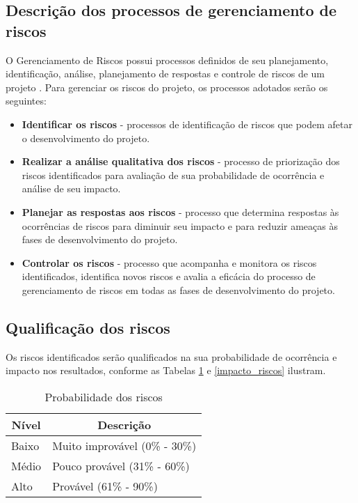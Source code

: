 \subsection{Descrição dos processos de gerenciamento de riscos}

O Gerenciamento de Riscos possui processos definidos de seu planejamento, identificação, análise, planejamento de respostas e controle de riscos de um projeto \cite{pmbok}.
Para gerenciar os riscos do projeto, os processos adotados serão os seguintes:

\begin{itemize}
  \item \textbf{Identificar os riscos} - processos de identificação de riscos que podem afetar o desenvolvimento do projeto.
  \item \textbf{Realizar a análise qualitativa dos riscos} - processo de priorização dos riscos identificados para avaliação de sua probabilidade de ocorrência e análise de seu impacto.
  \item \textbf{Planejar as respostas aos riscos} - processo que determina respostas às ocorrências de riscos para diminuir seu impacto e para reduzir ameaças às fases de desenvolvimento do projeto.
  \item \textbf{Controlar os riscos} - processo que acompanha e monitora os riscos identificados, identifica novos riscos e avalia a eficácia do processo de gerenciamento de riscos em todas as fases de desenvolvimento do projeto.
\end{itemize}


\subsection{Qualificação dos riscos}
Os riscos identificados serão qualificados na sua probabilidade de ocorrência e impacto nos resultados, conforme as Tabelas \ref{probabilidade_riscos} e \ref{impacto_riscos} ilustram.

\begin{table}[h]
\centering
\caption{Probabilidade dos riscos}
\label{probabilidade_riscos}
\begin{tabular}{|l|l|}
\hline
\multicolumn{1}{|c|}{\textbf{Nível}} & \multicolumn{1}{c|}{\textbf{Descrição}} \\ \hline
Baixo                                & Muito improvável (0\% - 30\%)       \\ \hline
Médio                                & Pouco provável (31\% - 60\%)            \\ \hline
Alto                                 & Provável (61\% - 90\%)                  \\ \hline
\end{tabular}
\end{table}


